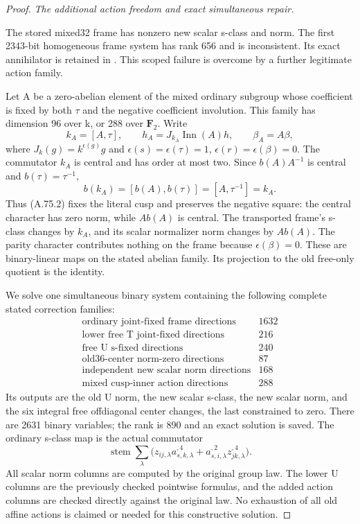 \begin{proof}
\emph{The additional action freedom and exact simultaneous repair.}\par
The stored mixed32 frame has nonzero new scalar s-class and norm.
The first 2343-bit homogeneous frame system has rank 656 and is
inconsistent. Its exact annihilator is retained in
. This scoped failure
is overcome by a further legitimate action family.

Let A be a zero-abelian element of the mixed ordinary subgroup whose
coefficient is fixed by both \(\tau\) and the negative coefficient
involution. This family has dimension 96 over k, or 288 over
\(\mathbf F_2\). Write
\[
 k_A=[A,\tau],\qquad
 h_A=J_{k_A}\operatorname{Inn}(A)h,
 \qquad \beta_A=A\beta,
 \tag{A.75.2}
\]
where \(J_k(g)=k^{\epsilon(g)}g\) and
\(\epsilon(s)=\epsilon(\tau)=1\),
\(\epsilon(r)=\epsilon(\beta)=0\).
The commutator \(k_A\) is central and has order at most two.
Since \(b(A)A^{-1}\) is central and \(b(\tau)=\tau^{-1}\),
\[
 b(k_A)=[b(A),b(\tau)]=[A,\tau^{-1}]=k_A.
\]
Thus (A.75.2) fixes the literal cusp and preserves the negative
square: the central character has zero norm, while
\(A b(A)\) is central. The transported frame's s-class changes
by \(k_A\), and its scalar normalizer norm changes by
\(A b(A)\). The parity character contributes nothing on the
frame because \(\epsilon(\beta)=0\). These are binary-linear
maps on the stated abelian family. Its projection to the old
free-only quotient is the identity.

We solve one simultaneous binary system containing the following
complete stated correction families:
\[
\begin{array}{c|r}
 \text{ordinary joint-fixed frame directions}&1632\\
 \text{lower free T joint-fixed directions}&216\\
 \text{free U s-fixed directions}&240\\
 \text{old36-center norm-zero directions}&87\\
 \text{independent new scalar norm directions}&168\\
 \text{mixed cusp-inner action directions}&288
\end{array}
 \tag{A.75.3}
\]
Its outputs are the old U norm, the new scalar s-class, the new
scalar norm, and the six integral free offdiagonal center changes,
the last constrained to zero. There are 2631 binary variables;
the rank is 890 and an exact solution is saved. The ordinary
s-class map is the actual commutator
\[
 \operatorname{stem}\sum_{\lambda}
     \bigl(z_{ij,\lambda}a_{s,k,\lambda}^{,4}
            +a_{s,i,\lambda}^{,2}z_{jk,\lambda}^{,4}\bigr).
 \tag{A.75.4}
\]
All scalar norm columns are computed by the original group law.
The lower U columns are the previously checked pointwise formulas,
and the added action columns are checked directly against the
original law. No exhaustion of all old affine actions is claimed
or needed for this constructive solution.


\end{proof}
